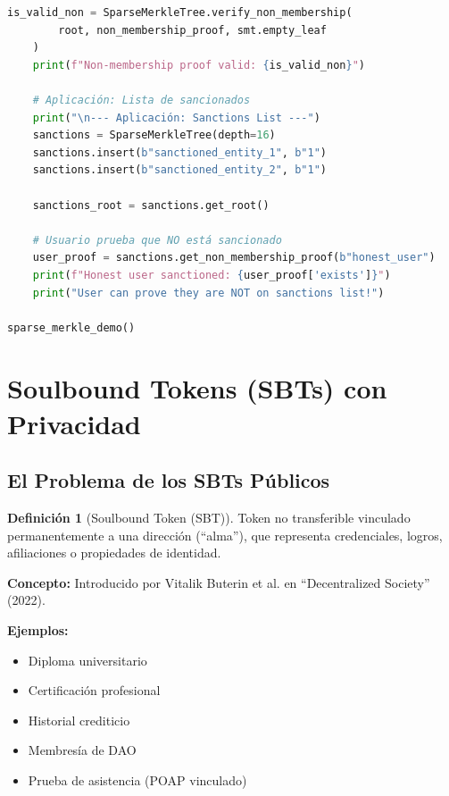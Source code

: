 \documentclass[11pt,a4paper,twoside]{book}
\theoremstyle{definition}
\newtheorem{definition}{Definición}[chapter]
\theoremstyle{remark}
\begin{document}
\begin{lstlisting}[language=Python, caption={Sparse Merkle Tree para non-membership proofs}]
    is_valid_non = SparseMerkleTree.verify_non_membership(
        root, non_membership_proof, smt.empty_leaf
    )
    print(f"Non-membership proof valid: {is_valid_non}")
    
    # Aplicación: Lista de sancionados
    print("\n--- Aplicación: Sanctions List ---")
    sanctions = SparseMerkleTree(depth=16)
    sanctions.insert(b"sanctioned_entity_1", b"1")
    sanctions.insert(b"sanctioned_entity_2", b"1")
    
    sanctions_root = sanctions.get_root()
    
    # Usuario prueba que NO está sancionado
    user_proof = sanctions.get_non_membership_proof(b"honest_user")
    print(f"Honest user sanctioned: {user_proof['exists']}")
    print("User can prove they are NOT on sanctions list!")

sparse_merkle_demo()
\end{lstlisting}
\section{Soulbound Tokens (SBTs) con Privacidad}
\label{sec:soulbound-tokens}

\subsection{El Problema de los SBTs Públicos}

\begin{definition}[Soulbound Token (SBT)]
Token no transferible vinculado permanentemente a una dirección (``alma''), que representa credenciales, logros, afiliaciones o propiedades de identidad.

\textbf{Concepto:} Introducido por Vitalik Buterin et al. en ``Decentralized Society'' (2022).

\textbf{Ejemplos:}
\begin{itemize}
    \item Diploma universitario
    \item Certificación profesional
    \item Historial crediticio
    \item Membresía de DAO
    \item Prueba de asistencia (POAP vinculado)
\end{itemize}
\end{definition}
\end{document}
